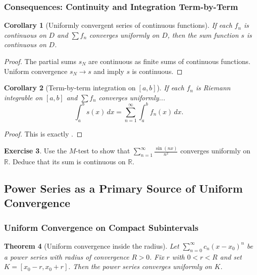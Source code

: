 \documentclass[12pt]{article}
\numberwithin{equation}{section}
\def\diff{d}
\newcommand{\RR}{\mathbb{R}}
\newcommand{\diff}{\mathop{}\!\mathrm{d}}    %
\theoremstyle{plain}
\newtheorem{theorem}{Theorem}[section]
\newtheorem{corollary}[theorem]{Corollary}
\theoremstyle{definition}
\newtheorem{exercise}[theorem]{Exercise}
\theoremstyle{remark}
\begin{document}
\subsubsection{Consequences: Continuity and Integration Term-by-Term}

\begin{corollary}[Uniformly convergent series of continuous functions]\label{cor:series-cont}
If each $f_n$ is continuous on $D$ and $\sum f_n$ converges uniformly on $D$, then the sum function $s$ is continuous on $D$.
\end{corollary}

\begin{proof}
The partial sums $s_N$ are continuous as finite sums of continuous functions.
Uniform convergence $s_N\to s$ and  imply $s$ is continuous.
\end{proof}

\begin{corollary}[Term-by-term integration on {$[a,b]$}]\label{cor:series-int2}
If each $f_n$ is Riemann integrable on $[a,b]$ and $\sum f_n$ converges uniformly...
\[
\int_a^b s(x)\,\diff x=\sum_{n=1}^\infty \int_a^b f_n(x)\,\diff x.
\]
\end{corollary}

\begin{proof}
This is exactly .
\end{proof}

\begin{exercise}
Use the $M$-test to show that $\sum_{n=1}^\infty \frac{\sin(nx)}{n^2}$ converges uniformly on $\RR$.
Deduce that its sum is continuous on $\RR$.
\end{exercise}

\newpage

\subsection{Power Series as a Primary Source of Uniform Convergence}

\subsubsection{Uniform Convergence on Compact Subintervals}

\begin{theorem}[Uniform convergence inside the radius]\label{thm:power-uniform}
Let $\sum_{n=0}^\infty c_n(x-x_0)^n$ be a power series with radius of convergence $R>0$.
Fix $r$ with $0<r<R$ and set $K=[x_0-r,x_0+r]$.
Then the power series converges uniformly on $K$.
\end{theorem}
\end{document}
